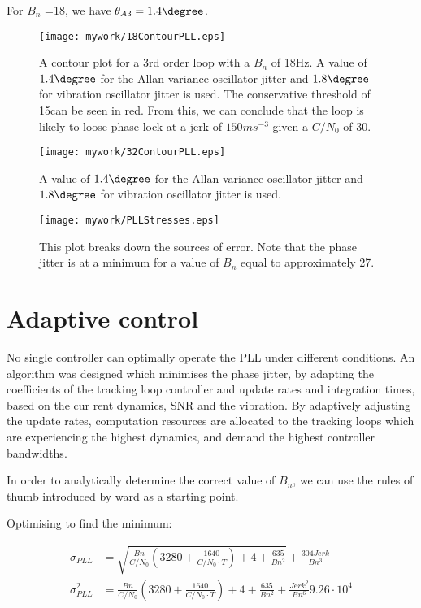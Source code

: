 For $B_n$ =18, we have $\theta_{A3}=1.4\degree$.


\begin{figure}[!htb] 
    \centering
    \texttt{[image: mywork/18ContourPLL.eps]} 
    \caption{A contour plot for a 3rd order loop with a $B_n$ of 18Hz. A value of $1.4\degree$ for the Allan variance oscillator jitter and $1.8\degree$ for vibration oscillator jitter is used. The conservative threshold of 15\degree can be seen in red. From this, we can conclude that the loop is likely to loose phase lock at a jerk of $150ms^{-3}$ given a $C/N_0$ of 30.}
\end{figure}

\begin{figure}[!htb] 
    \centering
    \texttt{[image: mywork/32ContourPLL.eps]} 
    \caption{A value of $1.4\degree$ for the Allan variance oscillator jitter and $1.8\degree$ for vibration oscillator jitter is used.}
\end{figure}


\begin{figure}[!htb] 
    \centering
    \texttt{[image: mywork/PLLStresses.eps]} 
    \caption{This plot breaks down the sources of error. Note that the phase jitter is at a minimum for a value of $B_n$ equal to approximately 27.}
\end{figure}


\section{Adaptive control}

No single controller can
optimally operate the PLL
under different conditions.
An algorithm was designed
which minimises the phase
jitter, by adapting the
coefficients of the tracking
loop controller and update
rates and integration times,
based on the cur rent
dynamics, SNR and the
vibration.
By adaptively adjusting the update rates, computation resources
are allocated to the tracking loops which are experiencing the
highest dynamics, and demand the highest controller
bandwidths.


In order to analytically determine the correct value of $B_n$, we can use the rules of thumb introduced by ward as a starting point. 





Optimising to find the minimum:

\begin{align*}
\sigma_{PLL} &= \sqrt{\frac{Bn}{C/N_0} \left(3280 + \frac{1640}{C/N_0 \cdot T}\right) + 4 + \frac{635}{Bn^{2}}} + \frac{304 Jerk}{Bn^{3}}\\
\sigma_{PLL}^2 &= \frac{Bn}{C/N_0} \left(3280 + \frac{1640}{C/N_0 \cdot T}\right) + 4 + \frac{635}{Bn^{2}} + \frac{Jerk^{2}}{Bn^{6}} 9.26 \cdot 10^{4}
\end{align*}


